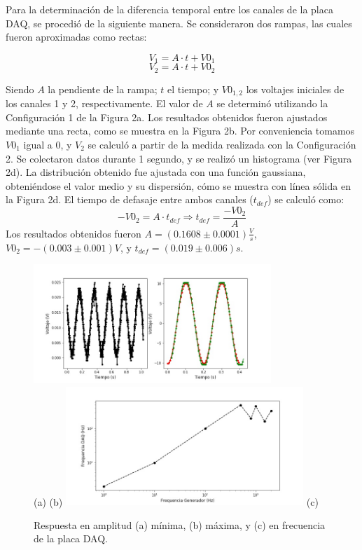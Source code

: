 \documentclass[a4paper,10pt]{article}
\begin{document}
Para la determinación de la diferencia temporal entre los canales de la placa DAQ, se procedió de la siguiente manera. Se consideraron dos rampas, las cuales fueron aproximadas como rectas:

\begin{equation*}
    V_{1} = A \cdot t + V0_1
\end{equation*}
\begin{equation*}
    V_{2} = A \cdot t + V0_2
\end{equation*}

Siendo $A$ la pendiente de la rampa; $t$ el tiempo; y $V0_{1,2}$ los voltajes iniciales de los canales 1 y 2, respectivamente.
El valor de $A$ se determinó utilizando la Configuración 1 de la Figura 2a. Los resultados obtenidos fueron ajustados mediante una recta, como se muestra en la Figura 2b. Por conveniencia tomamos $V0_1$ igual a $0$, y $V_2$ se calculó a partir de la medida realizada con la Configuración 2. Se colectaron datos durante 1 segundo, y se realizó un histograma (ver Figura 2d). La distribución obtenido fue ajustada con una función gaussiana, obteniéndose el valor medio y su dispersión, cómo se muestra con línea sólida en la Figura 2d. El tiempo de defasaje entre ambos canales ($t_{def}$) se calculó como:
\begin{equation*}
    -V0_{2} = A \cdot t_{def} \Rightarrow t_{def} = \frac{- V0_{2}}{A}
\end{equation*}
Los resultados obtenidos fueron $A=(0.1608 \pm 0.0001) \frac{V}{s}$, $V0_2 = -(0.003 \pm 0.001) V$, y $t_{def} = (0.019 \pm 0.006)s$.

\begin{figure}[H]
  \centering
  \includegraphics[width=0.8\textwidth]{DAQ_amplitud.jpg} \\
  (a) \hspace{4cm} (b)
  \includegraphics[trim={0 0 0 1.cm},clip, width=0.8\textwidth]{DAQ_logfrequency.jpg}
  (c)
  \caption{Respuesta en amplitud (a) mínima, (b) máxima, y (c) en frecuencia de la placa DAQ.}
  \label{fig:resp_freq}
\end{figure}
\end{document}
